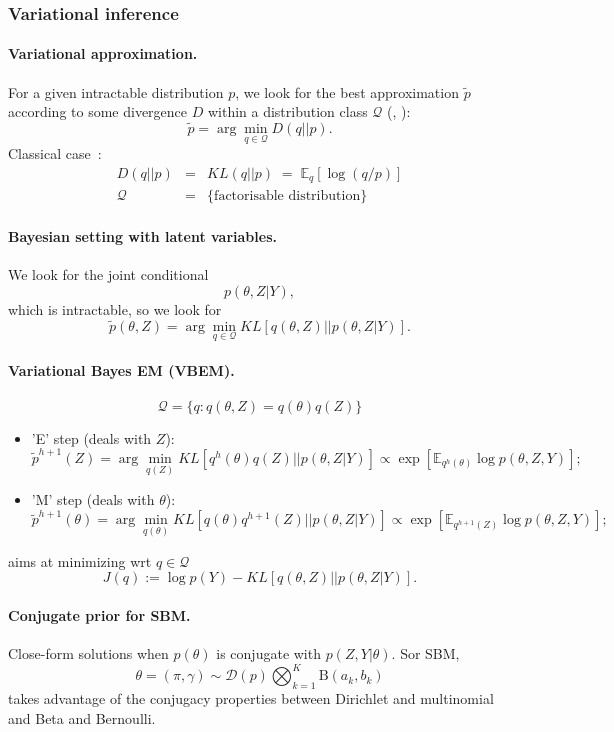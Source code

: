 \documentclass[12pt]{article}
\newcommand{\Esp}{\mathbb{E}}
\newcommand{\pt}{\widetilde{p}}
\newcommand{\Qcal}{\mathcal{Q}}
\begin{document}
\subsubsection{Variational inference}

\paragraph{Variational approximation.} For a given  intractable distribution $p$, we look for the best approximation $\pt$ according to some divergence $D$ within a distribution class $\Qcal$ (\cite{Min05}, \cite{Jaa00}):
$$
\pt = \arg\min_{q \in \Qcal} D(q||p).
$$
Classical case~: 
\begin{eqnarray*}
  D(q||p) & = & KL(q||p) \; = \; \Esp_q[\log(q/p)] \\
  \Qcal & = & \{\text{factorisable distribution}\}
\end{eqnarray*}

\paragraph{Bayesian setting with latent variables.} We look for the joint conditional 
$$
p(\theta, Z|Y),
$$
which is intractable, so we look for 
$$
\pt(\theta, Z) = \arg\min_{q \in \Qcal} KL[q(\theta, Z)||p(\theta, Z|Y)].
$$

\paragraph{Variational Bayes EM (VBEM).} \cite{BeG03}
$$
\Qcal = \{q: q(\theta, Z) = q(\theta)q(Z)\}
$$
\begin{itemize}
 \item 'E' step (deals with $Z$):
 $$ 
 \pt^{h+1}(Z) = \arg\min_{q(Z)} KL[q^{h}(\theta)q(Z)||p(\theta, Z|Y)] \propto \exp\left[\Esp_{q^{h}(\theta)} \log p(\theta, Z, Y) \right];
 $$ 
 \item 'M' step (deals with $\theta$): 
 $$ 
 \pt^{h+1}(\theta) = \arg\min_{q(\theta)} KL[q(\theta)q^{h+1}(Z)||p(\theta, Z|Y)] \propto \exp\left[\Esp_{q^{h+1}(Z)} \log p(\theta, Z, Y) \right];
 $$ 
\end{itemize}
aims at minimizing wrt $q \in \Qcal$ 
$$
J(q) := \log p(Y) - KL[q(\theta, Z) || p(\theta, Z|Y)].
$$

\paragraph{Conjugate prior for SBM.}
Close-form solutions when $p(\theta)$ is conjugate with $p(Z, Y|\theta)$. Sor SBM, 
$$
\theta = (\pi, \gamma) \sim \mathcal{D}(p) \bigotimes_{k = 1}^K \text{B}(a_k, b_k)
$$
takes advantage of the conjugacy properties between Dirichlet and multinomial and Beta and Bernoulli.
\end{document}
